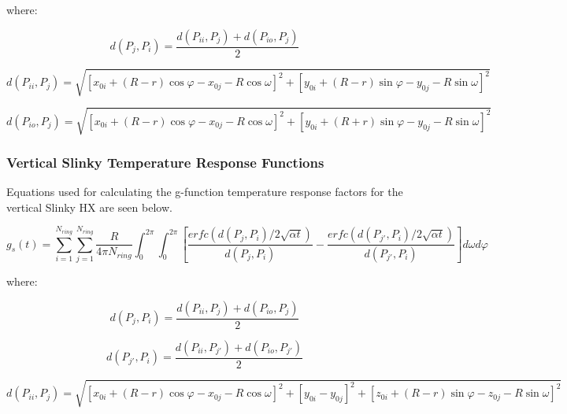 where:

\begin{equation}
d\left(P_j,P_i\right) = \frac{d\left(P_{ii},P_j\right) + d\left(P_{io},P_j\right)}{2}
\end{equation}

\begin{equation}
d\left(P_{ii},P_j\right) = \sqrt{\left[x_{0i} + \left(R-r\right)\cos \varphi - x_{0j}-R\cos \omega\right]^2 + \left[y_{0i} + \left(R-r\right)\sin \varphi - y_{0j}-R\sin \omega\right]^2}
\end{equation}

\begin{equation}
d\left(P_{io},P_j\right) = \sqrt{\left[x_{0i} + \left(R-r\right)\cos \varphi - x_{0j}-R\cos \omega\right]^2 + \left[y_{0i} + \left(R+r\right)\sin \varphi - y_{0j}-R\sin \omega\right]^2}
\end{equation}

\subsubsection{Vertical Slinky Temperature Response Functions}\label{vertical-slinky-temperature-response-functions}

Equations used for calculating the g-function temperature response factors for the vertical Slinky HX are seen below.

\begin{equation}
g_s\left(t\right) = \sum_{i = 1}^{N_{ring}} \sum_{j = 1}^{N_{ring}} \frac{R}{4\pi N_{ring}} \int_0^{2\pi} \int_0^{2\pi}
            \left[
                \frac{erfc\left(d\left(P_j,P_i\right)/2\sqrt{\alpha t}\right)}{d\left(P_j,P_i\right)} -
                \frac{erfc\left(d\left(P_{j'},P_i\right)/2\sqrt{\alpha t}\right)}{d\left(P_{j'},P_i\right)}
            \right]d\omega d\varphi
\end{equation}

where:

\begin{equation}
d\left(P_j,P_i\right) = \frac{d\left(P_{ii},P_j\right) + d\left(P_{io},P_j\right)}{2}
\end{equation}

\begin{equation}
d\left(P_{j'},P_i\right) = \frac{d\left(P_{ii},P_{j'}\right) + d\left(P_{io},P_{j'}\right)}{2}
\end{equation}

{\scriptsize
\begin{equation}
d\left(P_{ii},P_j\right) = \sqrt{\left[x_{0i} + \left(R-r\right)\cos \varphi - x_{0j}-R\cos \omega\right]^2 + \left[y_{0i}-y_{0j}\right]^2 + \left[z_{0i} + \left(R-r\right)\sin \varphi - z_{0j}-R\sin \omega\right]^2}
\end{equation}}


